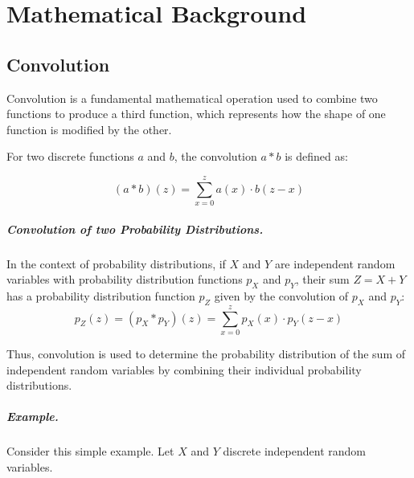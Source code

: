 \documentclass{masterthesis}
\begin{document}
\appendix

\chapter{Mathematical Background}\label{app:math_background} %

\section{Convolution}\label{app:convolution}

Convolution is a fundamental mathematical operation used to combine two functions to produce a third function, which represents how the shape of one function is modified by the other. 

For two discrete functions \(a\) and \(b\), the convolution \(a * b\) is defined as:

\begin{equation}
    (a * b)(z) = \sum_{x=0}^{z} a(x) \cdot b(z - x)
\end{equation}

\paragraph*{Convolution of two Probability Distributions.}\label{paragraph:convolution_distributions}
In the context of probability distributions, if \(X\) and \(Y\) are independent random variables with probability distribution functions \(p_X\) and \(p_Y\), their sum \(Z = X + Y\) has a probability distribution function \(p_Z\) given by the convolution of \(p_X\) and \(p_Y\):
\begin{equation}\label{eq:convolution}
    p_Z(z) = (p_X * p_Y)(z) = \sum_{x=0}^{z} p_X(x) \cdot p_Y(z - x)
\end{equation}

Thus, convolution is used to determine the probability distribution of the sum of independent random variables by combining their individual probability distributions.

\paragraph*{Example.} 

Consider this simple example. Let $X$ and $Y$ discrete independent random variables. 
\end{document}
